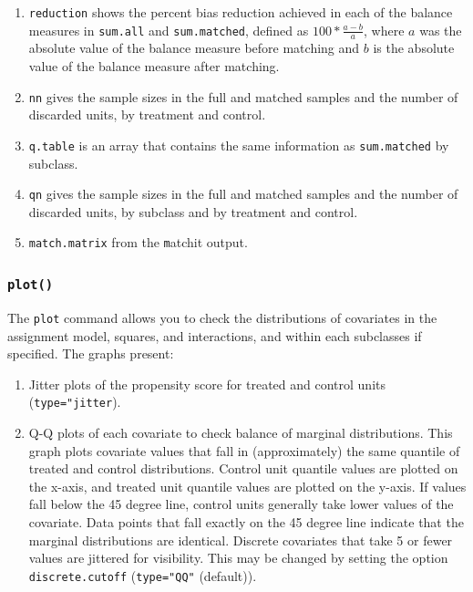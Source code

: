 \documentclass[oneside,letterpaper,titlepage]{article}
\begin{document}
\begin{enumerate}
\item \texttt{reduction} shows the percent bias reduction achieved in
  each of the balance measures in \texttt{sum.all} and
  \texttt{sum.matched}, defined as $100*\frac{a-b}{a}$, where $a$ was
  the absolute value of the balance measure before matching and $b$
  is the absolute value of the balance measure after matching.

\item \texttt{nn} gives the sample sizes in the full and matched
  samples and the number of discarded units, by treatment and control.
  
\item \texttt{q.table} is an array that contains the same information
  as \texttt{sum.matched} by subclass.
  
\item \texttt{qn} gives the sample sizes in the full and matched
  samples and the number of discarded units, by subclass and by treatment and control.
\item \texttt{match.matrix} from the {\texttt matchit} output.
\end{enumerate}

\subsubsection{{\tt plot()}}

The \texttt{plot} command allows you to check the distributions of
covariates in the assignment model, squares, and interactions, and
within each subclasses if specified.  The graphs present:
\begin{enumerate}
\item Jitter plots of the propensity score for treated and control
  units (\texttt{type="jitter}).
\item Q-Q plots of each covariate to check balance of marginal
  distributions.  This graph plots covariate values that fall in
  (approximately) the same quantile of treated and control
  distributions.  Control unit quantile values are plotted on the
  x-axis, and treated unit quantile values are plotted on the y-axis.
  If values fall below the 45 degree line, control units generally
  take lower values of the covariate.  Data points that fall exactly
  on the 45 degree line indicate that the marginal distributions are
  identical.  Discrete covariates that take 5 or fewer values are
  jittered for visibility.  This may be changed by setting the option
  \texttt{discrete.cutoff} (\texttt{type="QQ"} (default)).
\end{enumerate}
\end{document}
